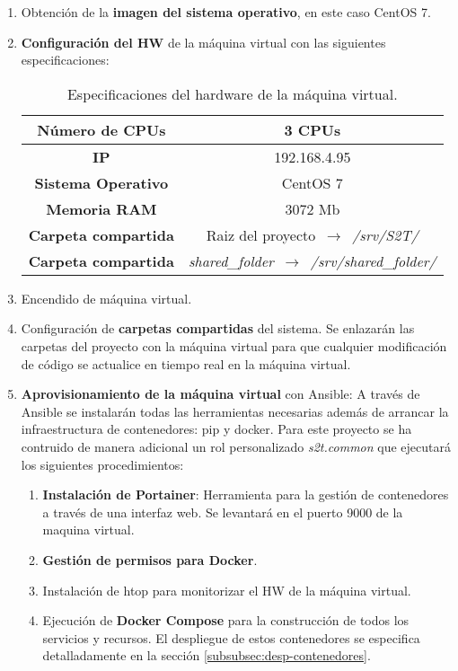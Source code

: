 \documentclass[../main.tex]{subfiles}
\begin{document}
\begin{enumerate}
    \item Obtención de la \textbf{imagen del sistema operativo}, en este caso CentOS 7.
    \item \textbf{Configuración del HW} de la máquina virtual con las siguientes especificaciones:
    \begin{table}[H]
    \centering
        \begin{tabular}{ |c|c| } 
         \hline
         \textbf{Número de CPUs} & 3 CPUs \\ 
         \hline
         \textbf{IP} & 192.168.4.95 \\ 
         \hline
         \textbf{Sistema Operativo} & CentOS 7\\ 
         \hline
         \textbf{Memoria RAM} & 3072 Mb\\ 
         \hline
         \textbf{Carpeta compartida} & Raiz del proyecto $\,\to\,$ \textit{/srv/S2T/}\\ 
         \hline
         \textbf{Carpeta compartida} & \textit{shared\_folder} $\,\to\,$ \textit{/srv/shared\_folder/}\\ 
         \hline
        \end{tabular}
    \caption{Especificaciones del hardware de la máquina virtual.}
    \label{tab:my_label}
    \end{table}
    
    \item Encendido de máquina virtual.
    
    \item Configuración de \textbf{carpetas compartidas} del sistema. Se enlazarán las carpetas del proyecto con la máquina virtual para que cualquier modificación de código se actualice en tiempo real en la máquina virtual.
    
    \item \textbf{Aprovisionamiento de la máquina virtual} con Ansible: A través de Ansible se instalarán todas las herramientas necesarias además de arrancar la infraestructura de contenedores: pip y docker. Para este proyecto se ha contruido de manera adicional un rol personalizado \textit{s2t.common} que ejecutará los siguientes procedimientos:
    \begin{enumerate}
        \item \textbf{Instalación de Portainer}: Herramienta para la gestión de contenedores a través de una interfaz web. Se levantará en el puerto 9000 de la maquina virtual.
        \item \textbf{Gestión de permisos para Docker}.
        \item Instalación de htop para monitorizar el HW de la máquina virtual.
        \item Ejecución de \textbf{Docker Compose} para la construcción de todos los servicios y recursos. El despliegue de estos contenedores se especifica detalladamente en la sección \ref{subsubsec:desp-contenedores}.
    \end{enumerate}
\end{enumerate}
\end{document}
